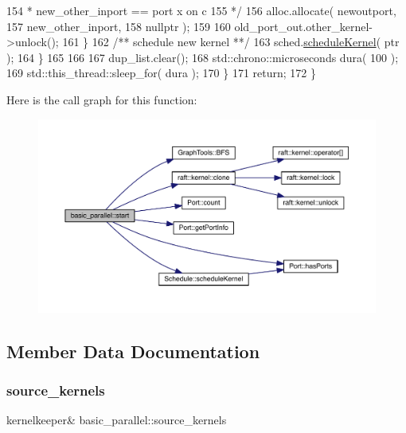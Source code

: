 \begin{DoxyCode}
154 \textcolor{comment}{             * new\_other\_inport == port x on c}
155 \textcolor{comment}{             */}
156             alloc.allocate( newoutport,
157                             new\_other\_inport,
158                             \textcolor{keyword}{nullptr} );
159 
160             old\_port\_out.other\_kernel->unlock();
161          \}\textcolor{comment}{}
162 \textcolor{comment}{         /** schedule new kernel **/}
163          sched.\hyperlink{class_schedule_a6a722f6e76c8b8dc67874d9974b6d641}{scheduleKernel}( ptr );
164       \}
165 
166 
167       dup\_list.clear();
168       std::chrono::microseconds dura( 100 );
169       std::this\_thread::sleep\_for( dura );
170    \}
171    \textcolor{keywordflow}{return};
172 \}
\end{DoxyCode}
Here is the call graph for this function\+:
\nopagebreak
\begin{figure}[H]
\begin{center}
\leavevmode
\includegraphics[width=350pt]{classbasic__parallel_a85ea2560d40ad50482468e39d626a52b_cgraph}
\end{center}
\end{figure}


\subsection{Member Data Documentation}
\hypertarget{classbasic__parallel_a969b8832b2f6eaea5e985d4582d9e4dc}{}\label{classbasic__parallel_a969b8832b2f6eaea5e985d4582d9e4dc} 
\subsubsection{\texorpdfstring{source\+\_\+kernels}{source\_kernels}}
{\footnotesize\ttfamily kernelkeeper\& basic\+\_\+parallel\+::source\+\_\+kernels\hspace{0.3cm}{\ttfamily [protected]}}

